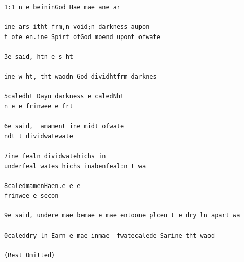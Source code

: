 \documentclass[11pt]{article}
\begin{document}
\begin{lstlisting}
1:1 n e beininGod Hae mae ane ar

ine ars itht frm,n void;n darkness aupon
t ofe en.ine Spirt ofGod moend upont ofwate

3e said, htn e s ht

ine w ht, tht waodn God dividhtfrm darknes

5caledht Dayn darkness e caledNht
n e e frinwee e frt

6e said,  amament ine midt ofwate
ndt t dividwatewate

7ine fealn dividwatehichs in
underfeal wates hichs inabenfeal:n t wa

8caledmamenHaen.e e e
frinwee e secon

9e said, undere mae bemae e mae entoone plcen t e dry ln apart wa

0caleddry ln Earn e mae inmae  fwatecalede Sarine tht waod

(Rest Omitted)

\end{lstlisting}
\end{document}
